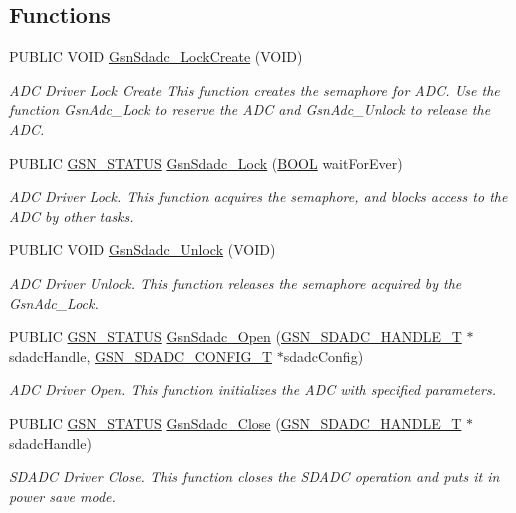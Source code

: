 \subsection*{Functions}
\begin{DoxyCompactItemize}
\item 
PUBLIC VOID \hyperlink{a00652_ga7c9488378b1a8357ba256ebfd68d95f7}{GsnSdadc\_\-LockCreate} (VOID)
\begin{DoxyCompactList}\small\item\em ADC Driver Lock Create This function creates the semaphore for ADC. Use the function GsnAdc\_\-Lock to reserve the ADC and GsnAdc\_\-Unlock to release the ADC. \end{DoxyCompactList}\item 
PUBLIC \hyperlink{a00660_gada5951904ac6110b1fa95e51a9ddc217}{GSN\_\-STATUS} \hyperlink{a00652_ga326684ff9e92abe74ac12c8e90fd8774}{GsnSdadc\_\-Lock} (\hyperlink{a00660_ga1f04022c0a182c51c059438790ea138c}{BOOL} waitForEver)
\begin{DoxyCompactList}\small\item\em ADC Driver Lock. This function acquires the semaphore, and blocks access to the ADC by other tasks. \end{DoxyCompactList}\item 
PUBLIC VOID \hyperlink{a00652_gae0488c542df3e91930273cbeaeacb8e9}{GsnSdadc\_\-Unlock} (VOID)
\begin{DoxyCompactList}\small\item\em ADC Driver Unlock. This function releases the semaphore acquired by the GsnAdc\_\-Lock. \end{DoxyCompactList}\item 
PUBLIC \hyperlink{a00660_gada5951904ac6110b1fa95e51a9ddc217}{GSN\_\-STATUS} \hyperlink{a00652_gaff241636b8aa96558b879d7fd8093f31}{GsnSdadc\_\-Open} (\hyperlink{a00214}{GSN\_\-SDADC\_\-HANDLE\_\-T} $\ast$sdadcHandle, \hyperlink{a00213}{GSN\_\-SDADC\_\-CONFIG\_\-T} $\ast$sdadcConfig)
\begin{DoxyCompactList}\small\item\em ADC Driver Open. This function initializes the ADC with specified parameters. \end{DoxyCompactList}\item 
PUBLIC \hyperlink{a00660_gada5951904ac6110b1fa95e51a9ddc217}{GSN\_\-STATUS} \hyperlink{a00652_ga94f6394af48a1bcbd2ec1c47b9bdfe60}{GsnSdadc\_\-Close} (\hyperlink{a00214}{GSN\_\-SDADC\_\-HANDLE\_\-T} $\ast$sdadcHandle)
\begin{DoxyCompactList}\small\item\em SDADC Driver Close. This function closes the SDADC operation and puts it in power save mode. \end{DoxyCompactList}\item 

\end{DoxyCompactItemize}
